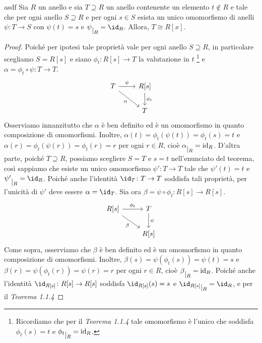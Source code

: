 \begin{teo}[]{asdf}
Sia $R$ un anello e sia $T\supseteq R$ un anello contenente un elemento $t\notin R$ e tale che per ogni anello $S\supseteq R$ e 
per ogni $s\in S$ esista un unico omomorfismo di anelli 
$\psi \colon T\to S$ con $\psi(t)=s$ e $\psi \raisebox{-.5em}{$\vert_{R}$}= \id_R$. Allora, $T\cong R[x]$.
\end{teo}
\vspace{-4mm}
\begin{proof}Poiché per ipotesi tale proprietà vale per ogni anello $S\supseteq R$, 
in particolare scegliamo $S=R[s]$ e siano $\phi_t\colon R[s]\to T$ la valutazione in $t$
\footnote{Ricordiamo che per il \emph{Teorema 1.1.4} tale omomorfismo è l'unico che soddisfa 
$\phi_t(s)=t$ e $\phi_t \raisebox{-.5em}{$\vert_{R}$}= \operatorname{id}_R$.} e $\alpha=\phi_t\circ \psi\colon T\to T$. 
\vspace{-2mm}
\[
  \begin{tikzcd}
    T \arrow{r}{\psi} \arrow[swap]{dr}{\alpha} & R[s] \arrow{d}{\phi_t} \\
     & T
  \end{tikzcd}
\]
Osserviamo innanzitutto che $\alpha$ è ben definito ed è un omomorfismo in quanto composizione di omomorfismi. 
Inoltre, $\alpha(t) = \phi_t(\psi(t)) = \phi_t(s)=t$ e $\alpha(r)=\phi_t(\psi(r))=\phi_t(r)=r$ 
per ogni $r\in R$, cioè $\alpha \raisebox{-.5em}{$\vert_{R}$}= \operatorname{id}_R$. 
D'altra parte, poiché $T\supseteq R$, possiamo scegliere $S=T$ e $s=t$ nell'enunciato del teorema, 
così sappiamo che esiste un unico omomorfismo $\psi'\colon T\to T$ 
tale che $\psi'(t)=t$ e $\psi' \raisebox{-.5em}{$\vert_{R}$}= \id_R$. 
Poiché anche l'identità $\id_T\colon T\to T$ soddisfa tali proprietà, 
per l'unicità di $\psi'$ deve essere $\alpha=\id_T$. Sia ora $\beta=\psi\circ \phi_t\colon R[s]\to R[s]$.
\vspace{-2mm}
\[
  \begin{tikzcd}
    R[s] \arrow{r}{\phi_t} \arrow[swap]{dr}{\beta} & T \arrow{d}{\psi} \\
     & R[s]
  \end{tikzcd}
\]
Come sopra, osserviamo che $\beta$ è ben definito ed è un omomorfismo in quanto composizione di omomorfismi. 
Inoltre, $\beta(s) = \psi(\phi_t(s)) = \psi(t)=s$ e $\beta(r)=\psi(\phi_t(r))=\psi(r)=r$ 
per ogni $r\in R$, cioè $\beta \raisebox{-.5em}{$\vert_{R}$}= \operatorname{id}_R$. 
Poiché anche l'identità $\id_{R[s]}\colon R[s]\to R[s]$ soddisfa $\id_{R[s]}(s)=s$ 
e $\id_{R[s]} \raisebox{-.5em}{$\vert_{R}$}= \id_R$, e per il \emph{Teorema 1.1.4} 

\end{proof}
